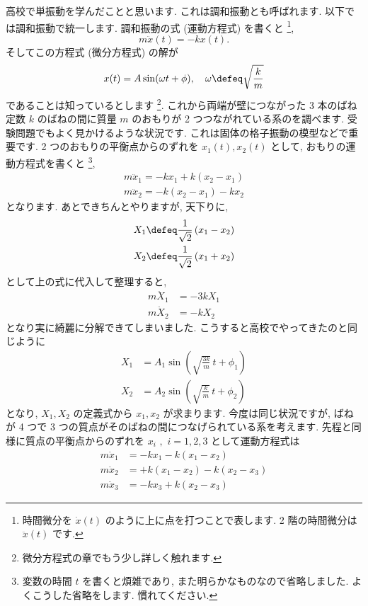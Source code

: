 \documentclass[openany, a4paper, oneside]{jsbook}
\begin{document}
高校で単振動を学んだことと思います.
これは調和振動とも呼ばれます.
以下では調和振動で統一します.
調和振動の式 (運動方程式) を書くと \footnote{時間微分を  $\dot{x}(t)$ のように上に点を打つことで表します.
2 階の時間微分は  $\ddot{x}(t)$ です.},
\begin{equation}
m\ddot{x}(t) = -kx (t).
\end{equation}
そしてこの方程式 (微分方程式) の解が
\begin{equation}
x (t) = A \sin (\omega t + \phi ), \quad \omega \defeq \sqrt{ \frac{k}{m} }
\end{equation}
であることは知っているとします \footnote{微分方程式の章でもう少し詳しく触れます.}.
これから両端が壁につながった 3 本のばね定数 $k$ のばねの間に質量 $m$ のおもりが 2 つつながれている系のを調べます.
受験問題でもよく見かけるような状況です. これは固体の格子振動の模型などで重要です.
2 つのおもりの平衡点からのずれを $x_{1}(t),x_{2}(t)$ として, おもりの運動方程式を書くと \footnote{変数の時間 $t$ を書くと煩雑であり, また明らかなものなので省略しました.
よくこうした省略をします.
慣れてください.},
\begin{align}
m\ddot{x}_{1} = -kx_{1} + k (x_{2} - x_{1}) \\
m\ddot{x}_{2} = - k (x_{2} - x_{1}) - kx_{2}
\end{align}
となります. あとできちんとやりますが, 天下りに,
\begin{align}
X_{1} \defeq \frac{1}{\sqrt{2}}\left ( x_{1} - x_{2} \right) \\
X_{2} \defeq \frac{1}{\sqrt{2}}\left ( x_{1} + x_{2} \right)
\end{align}
として上の式に代入して整理すると,
\begin{align}
    m\ddot{X}_{1} &= - 3kX_{1} \\
    m\ddot{X}_{2} &= -kX_{2}
\end{align}
となり実に綺麗に分解できてしまいました.
こうすると高校でやってきたのと同じように
\begin{align}
    X_1 &= A_1 \sin \left ( \sqrt{\frac{ 3k }{m}} \, t + \phi _1 \right) \\
    X_2 &= A_2 \sin \left ( \sqrt{\frac{ k }{m}} \, t + \phi _2 \right)
\end{align}
となり,  $X_1, X_2$ の定義式から $x_1,x_2$ が求まります.
今度は同じ状況ですが, ばねが 4 つで 3 つの質点がそのばねの間につなげられている系を考えます.
先程と同様に質点の平衡点からのずれを $x_{i}\,\,,\,\,i=1,2,3$ として運動方程式は
\begin{align}
m\ddot{x}_{1} &= -kx_1 - k (x_1 - x_2 ) \\
m\ddot{x}_{2} &= + k (x_1 - x_2 ) - k (x_2 - x_3) \\
m\ddot{x}_{3} &= -kx_3 +k (x_2 - x_3 )
\end{align}
\end{document}
